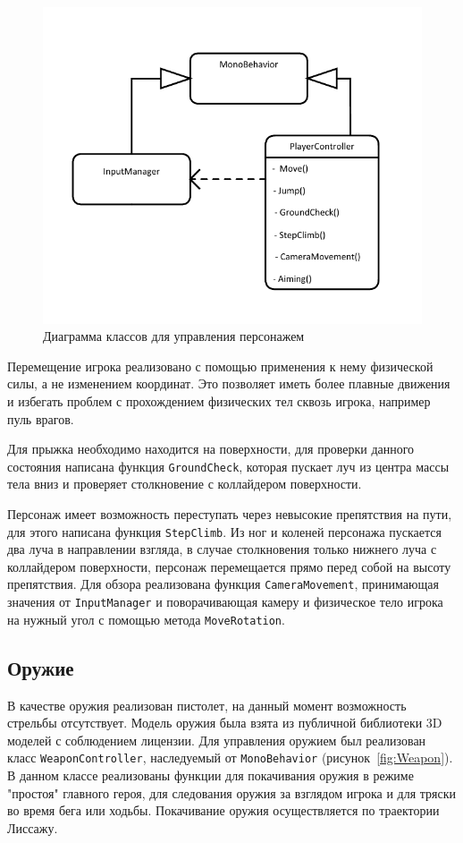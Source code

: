 \begin{figure}[H]
    \centering
    \includegraphics[width=\textwidth]{figures/PlayerController.pdf}
    \caption{Диаграмма классов для управления персонажем}
    \label{fig:Controller}
\end{figure}

Перемещение игрока реализовано с помощью применения к нему физической силы, а не изменением координат. Это позволяет иметь более плавные движения и избегать проблем с прохождением физических тел сквозь игрока, например пуль врагов. 

Для прыжка необходимо находится на поверхности, для проверки данного состояния написана функция \texttt{GroundCheck}, которая пускает луч из центра массы тела вниз и проверяет столкновение с коллайдером поверхности.

Персонаж имеет возможность переступать через невысокие препятствия на пути, для этого написана функция \texttt{StepClimb}. Из ног и коленей персонажа пускается два луча в направлении взгляда, в случае столкновения только нижнего луча с коллайдером поверхности, персонаж перемещается прямо перед собой на высоту препятствия.
Для обзора реализована функция \texttt{CameraMovement}, принимающая значения от \texttt{InputManager} и поворачивающая камеру и физическое тело игрока на нужный угол с помощью метода \texttt{MoveRotation}.

\subsection{Оружие}
В качестве оружия реализован пистолет, на данный момент возможность стрельбы отсутствует. Модель оружия была взята из публичной библиотеки 3D моделей с соблюдением лицензии. Для управления оружием был реализован класс \texttt{WeaponController}, наследуемый от \texttt{MonoBehavior} (рисунок~\ref{fig:Weapon}). В данном классе реализованы функции для покачивания оружия в режиме "простоя" главного героя, для следования оружия за взглядом игрока и для тряски во время бега или ходьбы. Покачивание оружия осуществляется по траектории Лиссажу.

